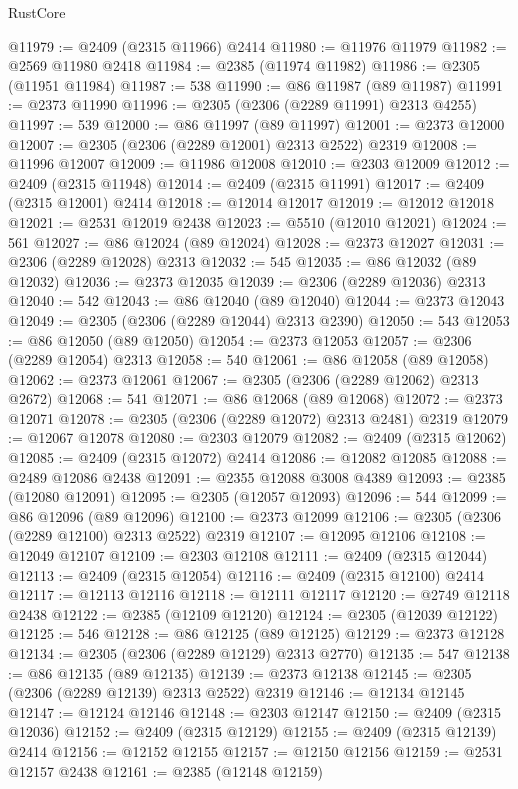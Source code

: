 \begin{lexlean}{RustCore}
\begin{coremodule}
@11979 := @2409 (@2315 @11966) @2414
@11980 := @11976 @11979
@11982 := @2569 @11980 @2418
@11984 := @2385 (@11974 @11982)
@11986 := @2305 (@11951 @11984)
@11987 := 538
@11990 := @86 @11987 (@89 @11987)
@11991 := @2373 @11990
@11996 := @2305 (@2306 (@2289 @11991) @2313 @4255)
@11997 := 539
@12000 := @86 @11997 (@89 @11997)
@12001 := @2373 @12000
@12007 := @2305 (@2306 (@2289 @12001) @2313 @2522) @2319
@12008 := @11996 @12007
@12009 := @11986 @12008
@12010 := @2303 @12009
@12012 := @2409 (@2315 @11948)
@12014 := @2409 (@2315 @11991)
@12017 := @2409 (@2315 @12001) @2414
@12018 := @12014 @12017
@12019 := @12012 @12018
@12021 := @2531 @12019 @2438
@12023 := @5510 (@12010 @12021)
@12024 := 561
@12027 := @86 @12024 (@89 @12024)
@12028 := @2373 @12027
@12031 := @2306 (@2289 @12028) @2313
@12032 := 545
@12035 := @86 @12032 (@89 @12032)
@12036 := @2373 @12035
@12039 := @2306 (@2289 @12036) @2313
@12040 := 542
@12043 := @86 @12040 (@89 @12040)
@12044 := @2373 @12043
@12049 := @2305 (@2306 (@2289 @12044) @2313 @2390)
@12050 := 543
@12053 := @86 @12050 (@89 @12050)
@12054 := @2373 @12053
@12057 := @2306 (@2289 @12054) @2313
@12058 := 540
@12061 := @86 @12058 (@89 @12058)
@12062 := @2373 @12061
@12067 := @2305 (@2306 (@2289 @12062) @2313 @2672)
@12068 := 541
@12071 := @86 @12068 (@89 @12068)
@12072 := @2373 @12071
@12078 := @2305 (@2306 (@2289 @12072) @2313 @2481) @2319
@12079 := @12067 @12078
@12080 := @2303 @12079
@12082 := @2409 (@2315 @12062)
@12085 := @2409 (@2315 @12072) @2414
@12086 := @12082 @12085
@12088 := @2489 @12086 @2438
@12091 := @2355 @12088 @3008 @4389
@12093 := @2385 (@12080 @12091)
@12095 := @2305 (@12057 @12093)
@12096 := 544
@12099 := @86 @12096 (@89 @12096)
@12100 := @2373 @12099
@12106 := @2305 (@2306 (@2289 @12100) @2313 @2522) @2319
@12107 := @12095 @12106
@12108 := @12049 @12107
@12109 := @2303 @12108
@12111 := @2409 (@2315 @12044)
@12113 := @2409 (@2315 @12054)
@12116 := @2409 (@2315 @12100) @2414
@12117 := @12113 @12116
@12118 := @12111 @12117
@12120 := @2749 @12118 @2438
@12122 := @2385 (@12109 @12120)
@12124 := @2305 (@12039 @12122)
@12125 := 546
@12128 := @86 @12125 (@89 @12125)
@12129 := @2373 @12128
@12134 := @2305 (@2306 (@2289 @12129) @2313 @2770)
@12135 := 547
@12138 := @86 @12135 (@89 @12135)
@12139 := @2373 @12138
@12145 := @2305 (@2306 (@2289 @12139) @2313 @2522) @2319
@12146 := @12134 @12145
@12147 := @12124 @12146
@12148 := @2303 @12147
@12150 := @2409 (@2315 @12036)
@12152 := @2409 (@2315 @12129)
@12155 := @2409 (@2315 @12139) @2414
@12156 := @12152 @12155
@12157 := @12150 @12156
@12159 := @2531 @12157 @2438
@12161 := @2385 (@12148 @12159)

\end{coremodule}
\end{lexlean}
